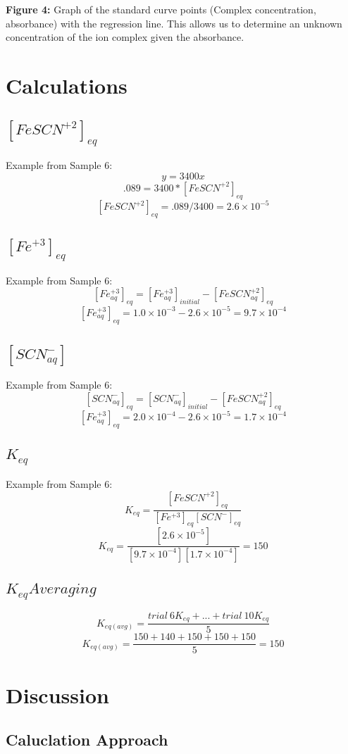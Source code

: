 \documentclass{article}
\begin{document}
\textbf{Figure 4:} Graph of the standard curve points (Complex concentration, absorbance) with the regression line. This allows us to determine an unknown concentration of the ion complex given the absorbance.

\newpage
\section{Calculations}
\subsection{$[FeSCN^{+2}]_{eq}$}
Example from Sample 6: 
$$y=3400x$$
$$.089=3400*[FeSCN^{+2}]_{eq}$$
$$[FeSCN^{+2}]_{eq}=.089/3400 = 2.6\times10^{-5}$$
\subsection{$[Fe^{+3}]_{eq}$}
Example from Sample 6:
$$[{Fe^{+3}_{aq}}]_{eq} = [{Fe^{+3}_{aq}}]_{initial} - [{FeSCN^{+2}_{aq}}]_{eq}$$
$$[{Fe^{+3}_{aq}}]_{eq} = 1.0\times10^{-3} - 2.6\times10^{-5} = 9.7\times10^{-4}$$
\subsection{$[SCN^-_{aq}]$}
Example from Sample 6:
$$[{SCN^{-}_{aq}}]_{eq} = [{SCN^-_{aq}}]_{initial} - [{FeSCN^{+2}_{aq}}]_{eq}$$
$$[{Fe^{+3}_{aq}}]_{eq} = 2.0\times10^{-4} - 2.6\times10^{-5} = 1.7\times10^{-4}$$
\subsection{$K_{eq}$}
Example from Sample 6:
$$K_{eq} = \frac{[FeSCN^{+2}]_{eq}}{[Fe^{+3}]_{eq}[SCN^-]_{eq}}$$
$$K_{eq} = \frac{[2.6\times10^{-5}]}{[9.7\times10^{-4}][1.7\times 10^{-4}]} = 150$$
\subsection{$K_{eq} Averaging$}
$$K_{eq(avg)} = \frac{trial\ 6 K_{eq}+...+trial\ 10 K_{eq}}{5}$$
$$K_{eq(avg)} = \frac{150+140+150+150+150}{5} = 150$$

\newpage
\section{Discussion}
\subsection{Caluclation Approach}
\end{document}
